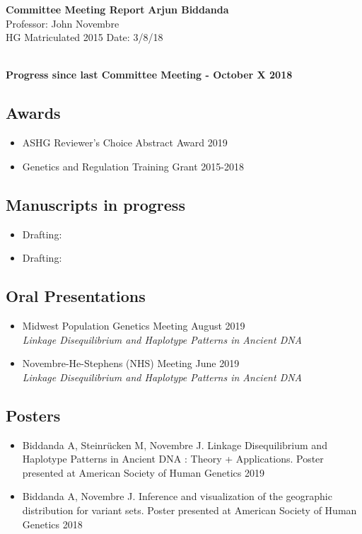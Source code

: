 \documentclass[a4paper, 11pt]{article}
\begin{document}
\noindent
\large\textbf{Committee Meeting Report} \hfill \textbf{Arjun Biddanda} \\
\normalsize  \hfill Professor: John Novembre  \\
HG Matriculated 2015 \hfill Date: 3/8/18 \\
\noindent\makebox[\linewidth]{\rule{\paperwidth}{0.4pt}}

\large\textbf{\\Progress since last Committee Meeting - October X 2018}
\subsection*{Awards}
\begin{itemize}
    \item ASHG Reviewer's Choice Abstract Award  \hfill 2019 
    \item Genetics and Regulation Training Grant \hfill 2015-2018
\end{itemize} 

\subsection*{Manuscripts in progress}
\begin{itemize}
    \item Drafting:  
		\item Drafting:
\end{itemize}

\subsection*{Oral Presentations}
\begin{itemize}
	\item Midwest Population Genetics Meeting \hfill August 2019 \\ \emph{Linkage Disequilibrium and Haplotype Patterns in Ancient DNA}
	\item Novembre-He-Stephens (NHS) Meeting \hfill June 2019 \\ \emph{Linkage Disequilibrium and Haplotype Patterns in Ancient DNA}   
\end{itemize}

\subsection*{Posters}
\begin{itemize}
	 \item Biddanda A, Steinr\"{u}cken M, Novembre J. Linkage Disequilibrium and Haplotype Patterns in Ancient DNA : Theory + Applications. Poster presented at American Society of Human Genetics 2019
	 \item Biddanda A, Novembre J. Inference and visualization of the geographic distribution for variant sets. Poster presented at American Society of Human Genetics 2018 
\end{itemize}
\end{document}
